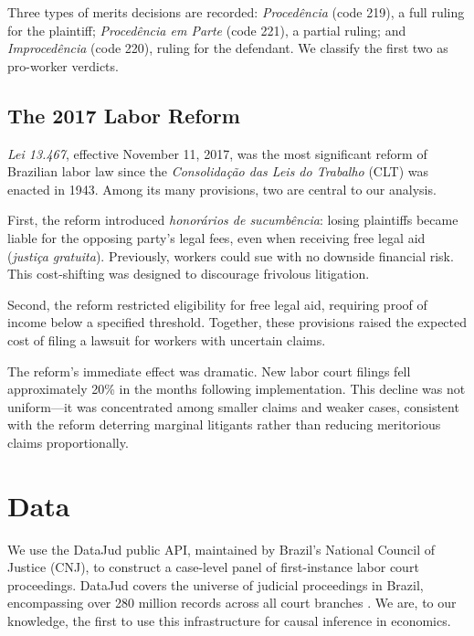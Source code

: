 \documentclass[12pt]{article}
\begin{document}
Three types of merits decisions are recorded: \textit{Proced\^{e}ncia} (code 219), a full ruling for the plaintiff; \textit{Proced\^{e}ncia em Parte} (code 221), a partial ruling; and \textit{Improced\^{e}ncia} (code 220), ruling for the defendant. We classify the first two as pro-worker verdicts.

\subsection{The 2017 Labor Reform}

\textit{Lei 13.467}, effective November 11, 2017, was the most significant reform of Brazilian labor law since the \textit{Consolida\c{c}\~{a}o das Leis do Trabalho} (CLT) was enacted in 1943. Among its many provisions, two are central to our analysis.

First, the reform introduced \textit{honor\'{a}rios de sucumb\^{e}ncia}: losing plaintiffs became liable for the opposing party's legal fees, even when receiving free legal aid (\textit{justi\c{c}a gratuita}). Previously, workers could sue with no downside financial risk. This cost-shifting was designed to discourage frivolous litigation.

Second, the reform restricted eligibility for free legal aid, requiring proof of income below a specified threshold. Together, these provisions raised the expected cost of filing a lawsuit for workers with uncertain claims.

The reform's immediate effect was dramatic. New labor court filings fell approximately 20\% in the months following implementation. This decline was not uniform---it was concentrated among smaller claims and weaker cases, consistent with the reform deterring marginal litigants rather than reducing meritorious claims proportionally.

\section{Data}

We use the DataJud public API, maintained by Brazil's National Council of Justice (CNJ), to construct a case-level panel of first-instance labor court proceedings. DataJud covers the universe of judicial proceedings in Brazil, encompassing over 280 million records across all court branches \citep{araujo2023datajud}. We are, to our knowledge, the first to use this infrastructure for causal inference in economics.
\end{document}
